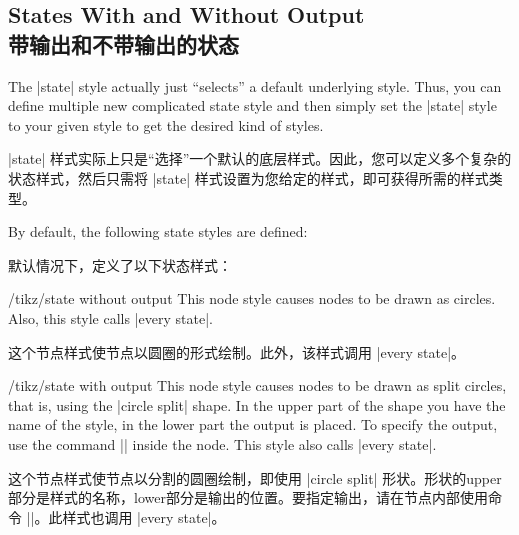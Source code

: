 \subsection{States With and Without Output\\带输出和不带输出的状态}

The |state| style actually just ``selects'' a default underlying style. Thus,
you can define multiple new complicated state style and then simply set the
|state| style to your given style to get the desired kind of styles.

|state| 样式实际上只是“选择”一个默认的底层样式。因此，您可以定义多个复杂的状态样式，然后只需将 |state| 样式设置为您给定的样式，即可获得所需的样式类型。

By default, the following state styles are defined:

默认情况下，定义了以下状态样式：

%
\begin{stylekey}{/tikz/state without output}
    This node style causes nodes to be drawn as circles. Also, this style calls
    |every state|.

    这个节点样式使节点以圆圈的形式绘制。此外，该样式调用 |every state|。

\end{stylekey}

\begin{stylekey}{/tikz/state with output}
    This node style causes nodes to be drawn as split circles, that is, using
    the |circle split| shape. In the upper part of the shape you have the name
    of the style, in the lower part the output is placed. To specify the
    output, use the command || inside the node. This style also
    calls |every state|.
    
    这个节点样式使节点以分割的圆圈绘制，即使用 |circle split| 形状。形状的upper部分是样式的名称，lower部分是输出的位置。要指定输出，请在节点内部使用命令 ||。此样式也调用 |every state|。


\begin{codeexample}[preamble={\usetikzlibrary{automata}}]
\end{codeexample}
\end{stylekey}

